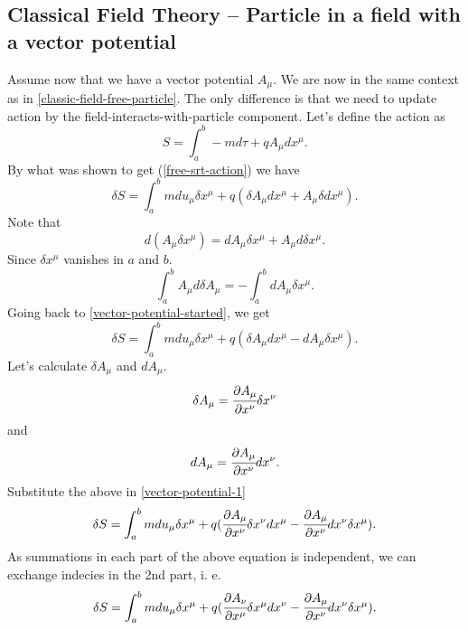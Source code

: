 \documentclass[main.tex]{subfiles}
\begin{document}
\subsection{Classical Field Theory -- Particle in a field with a vector potential}
Assume now that we have a vector potential $A_\mu$. We are now in the same context as in \ref{classic-field-free-particle}. The only difference is that we need to update action by the field-interacts-with-particle component. Let's define the action as
\begin{equation}
S = \int_a^b -md\tau + qA_\mu dx^\mu.
\end{equation}
By what was shown to get (\ref{free-srt-action}) we have
\begin{equation}
\label{vector-potential-started}
\delta S = \int_a^b mdu_\mu \delta x^\mu + q(\delta A_\mu dx^\mu + A_\mu \delta dx^\mu).
\end{equation}
Note that
\begin{equation}
d(A_\mu \delta x^\mu) = dA_\mu \delta x^\mu + A_\mu d\delta x^\mu.
\end{equation}
Since $\delta x^\mu$ vanishes in $a$ and $b$.
\begin{equation}
\int_a^b A_\mu d\delta A_\mu = -\int_a^b dA_\mu \delta x^\mu.
\end{equation}
Going back to \ref{vector-potential-started}, we get
\begin{equation}
\label{vector-potential-1}
\delta S = \int_a^b mdu_\mu \delta x^\mu + q(\delta A_\mu dx^\mu - dA_\mu \delta x^\mu).
\end{equation}
Let's calculate $\delta A_\mu$ and $dA_\mu$.
\begin{equation}
\delta A_\mu = \cfrac{\partial A_\mu}{\partial x^\nu}\delta x^\nu
\end{equation}
and
\begin{equation}
d A_\mu = \cfrac{\partial A_\mu}{\partial x^\nu}dx^\nu.
\end{equation}
Substitute the above in \ref{vector-potential-1}
\begin{equation}
\delta S = \int_a^b mdu_\mu \delta x^\mu + q(\cfrac{\partial A_\mu}{\partial x^\nu}\delta x^\nu dx^\mu - \cfrac{\partial A_\mu}{\partial x^\nu}dx^\nu \delta x^\mu).
\end{equation}
As summations in each part of the above equation is independent, we can exchange indecies in the 2nd part, i. e.
\begin{equation}
\delta S = \int_a^b mdu_\mu \delta x^\mu + 
q(\cfrac{\partial A_\nu}{\partial x^\mu}\delta x^\mu dx^\nu - \cfrac{\partial A_\mu}{\partial x^\nu}dx^\nu \delta x^\mu).
\end{equation}
\end{document}
